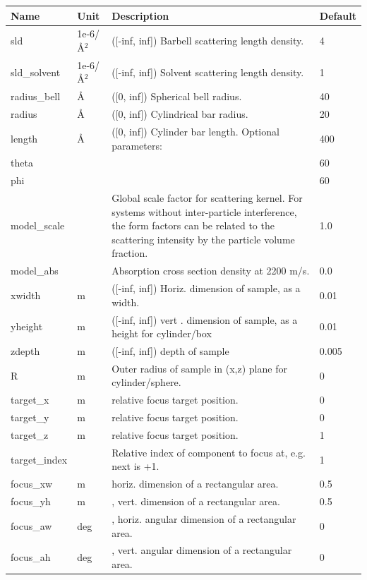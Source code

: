 \begin{longtable}{p{}p{}p{}p{}}
\toprule
\textbf{Name} & \textbf{Unit} & \textbf{Description} & \textbf{Default} \\
\midrule
\endhead
sld & 1e-6/\AA{}$^{2}$ & ([-inf, inf]) Barbell scattering length density. & 4 \\
sld\_solvent & 1e-6/\AA{}$^{2}$ & ([-inf, inf]) Solvent scattering length density. & 1 \\
radius\_bell & \AA{} & ([0, inf]) Spherical bell radius. & 40 \\
radius & \AA{} & ([0, inf]) Cylindrical bar radius. & 20 \\
length & \AA{} & ([0, inf]) Cylinder bar length. Optional parameters: & 400 \\
theta &  &  & 60 \\
phi &  &  & 60 \\
model\_scale &   & Global scale factor for scattering kernel. For systems without inter-particle interference, the form factors can be related to the scattering intensity by the particle volume fraction. & 1.0 \\
model\_abs &   & Absorption cross section density at 2200 m/s. & 0.0 \\
xwidth & m & ([-inf, inf]) Horiz. dimension of sample, as a width. & 0.01 \\
yheight & m & ([-inf, inf]) vert . dimension of sample, as a height for cylinder/box & 0.01 \\
zdepth & m & ([-inf, inf]) depth of sample & 0.005 \\
R & m & Outer radius of sample in (x,z) plane for cylinder/sphere. & 0 \\
target\_x & m & relative focus target position. & 0 \\
target\_y & m & relative focus target position. & 0 \\
target\_z & m & relative focus target position. & 1 \\
target\_index &   & Relative index of component to focus at, e.g. next is +1. & 1 \\
focus\_xw & m & horiz. dimension of a rectangular area. & 0.5 \\
focus\_yh & m & , vert. dimension of a rectangular area. & 0.5 \\
focus\_aw & deg & , horiz. angular dimension of a rectangular area. & 0 \\
focus\_ah & deg & , vert. angular dimension of a rectangular area. & 0 \\

\end{longtable}
